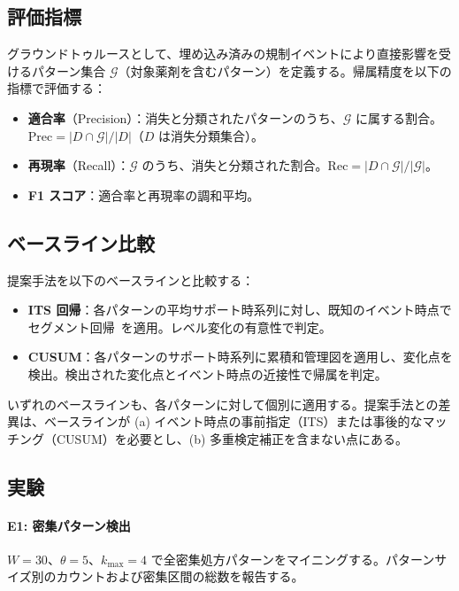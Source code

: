 \documentclass[11pt]{article}
\begin{document}
\subsection{評価指標}

グラウンドトゥルースとして、埋め込み済みの規制イベントにより直接影響を受けるパターン集合 $\mathcal{G}$（対象薬剤を含むパターン）を定義する。帰属精度を以下の指標で評価する：

\begin{itemize}
\item \textbf{適合率}（Precision）：消失と分類されたパターンのうち、$\mathcal{G}$ に属する割合。$\mathrm{Prec} = |D \cap \mathcal{G}| / |D|$（$D$ は消失分類集合）。
\item \textbf{再現率}（Recall）：$\mathcal{G}$ のうち、消失と分類された割合。$\mathrm{Rec} = |D \cap \mathcal{G}| / |\mathcal{G}|$。
\item \textbf{F1 スコア}：適合率と再現率の調和平均。
\end{itemize}

\subsection{ベースライン比較}

提案手法を以下のベースラインと比較する：

\begin{itemize}
\item \textbf{ITS 回帰}：各パターンの平均サポート時系列に対し、既知のイベント時点でセグメント回帰~\citep{wagner2002its}を適用。レベル変化の有意性で判定。
\item \textbf{CUSUM}：各パターンのサポート時系列に累積和管理図を適用し、変化点を検出。検出された変化点とイベント時点の近接性で帰属を判定。
\end{itemize}

いずれのベースラインも、各パターンに対して個別に適用する。提案手法との差異は、ベースラインが (a) イベント時点の事前指定（ITS）または事後的なマッチング（CUSUM）を必要とし、(b) 多重検定補正を含まない点にある。

\subsection{実験}

\paragraph{E1: 密集パターン検出}
$W = 30$、$\theta = 5$、$k_{\max} = 4$ で全密集処方パターンをマイニングする。パターンサイズ別のカウントおよび密集区間の総数を報告する。
\end{document}
